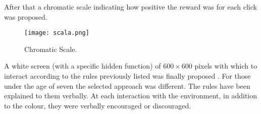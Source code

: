 After that a chromatic scale indicating how positive the reward was for each click was proposed.

\begin{figure}[h!]
	\centering
	\texttt{[image: scala.png]}
	\caption{Chromatic Scale.}
	\label{fig:Cromatic Scale}
\end{figure}

A white screen (with a specific hidden function) of $600 \times 600$ pixels with which to interact according to the rules previously listed was finally proposed . For those under the age of seven the selected approach was different. The rules have been explained to them verbally. At each interaction with the environment, in addition to the colour, they were verbally encouraged or discouraged.









